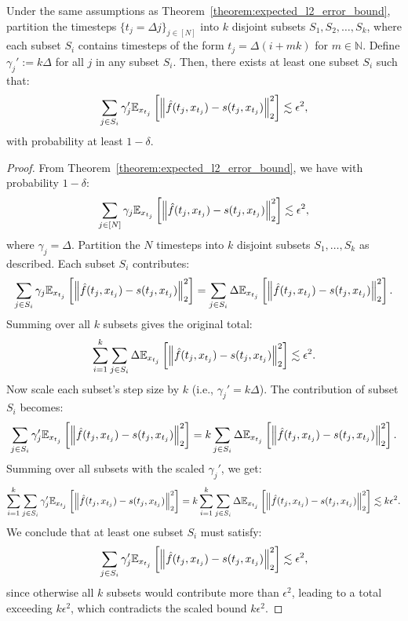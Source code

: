 \begin{theorem}\label{thm:subsampled_error_bound_appendix}
Under the same assumptions as Theorem~\ref{theorem:expected_l2_error_bound}, partition the timesteps $\{t_j = \Delta j\}_{j \in [N]}$ into $k$ disjoint subsets $S_1, S_2, \dots, S_k$, where each subset $S_i$ contains timesteps of the form $t_j = \Delta(i + mk)$ for $m \in \mathbb{N}$. Define $\gamma_j' := k\Delta$ for all $j$ in any subset $S_i$. Then, there exists at least one subset $S_i$ such that:
\[
\sum_{j \in S_i} \gamma_j' \mathbb{E}_{x_{t_j}}\left[\left\lVert\hat{f}(t_j, x_{t_j}) - s(t_j, x_{t_j})\right\rVert_2^2\right] \lesssim \epsilon^2,
\]
with probability at least $1 - \delta$.
\end{theorem}
\begin{proof}
From Theorem~\ref{theorem:expected_l2_error_bound}, we have with probability $1-\delta$:
\[
\sum_{j \in [N]} \gamma_j \mathbb{E}_{x_{t_j}}\left[\left\lVert\hat{f}(t_j, x_{t_j}) - s(t_j, x_{t_j})\right\rVert_2^2\right] \lesssim \epsilon^2,
\]
where $\gamma_j = \Delta$. Partition the $N$ timesteps into $k$ disjoint subsets $S_1, \dots, S_k$ as described. Each subset $S_i$ contributes:
\[
\sum_{j \in S_i} \gamma_j \mathbb{E}_{x_{t_j}}\left[\left\lVert\hat{f}(t_j, x_{t_j}) - s(t_j, x_{t_j})\right\rVert_2^2\right] = \sum_{j \in S_i} \Delta \mathbb{E}_{x_{t_j}}\left[\left\lVert\hat{f}(t_j, x_{t_j}) - s(t_j, x_{t_j})\right\rVert_2^2\right].
\]
Summing over all $k$ subsets gives the original total:
\[
\sum_{i=1}^k \sum_{j \in S_i} \Delta \mathbb{E}_{x_{t_j}}\left[\left\lVert\hat{f}(t_j, x_{t_j}) - s(t_j, x_{t_j})\right\rVert_2^2\right] \lesssim \epsilon^2.
\]
Now scale each subset's step size by $k$ (i.e., $\gamma_j' = k\Delta$). The contribution of subset $S_i$ becomes:
\[
\sum_{j \in S_i} \gamma_j' \mathbb{E}_{x_{t_j}}\left[\left\lVert\hat{f}(t_j, x_{t_j}) - s(t_j, x_{t_j})\right\rVert_2^2\right] = k \sum_{j \in S_i} \Delta \mathbb{E}_{x_{t_j}}\left[\left\lVert\hat{f}(t_j, x_{t_j}) - s(t_j, x_{t_j})\right\rVert_2^2\right].
\]
Summing over all subsets with the scaled $\gamma_j'$, we get:
\[
\sum_{i=1}^k \sum_{j \in S_i} \gamma_j' \mathbb{E}_{x_{t_j}}\left[\left\lVert\hat{f}(t_j, x_{t_j}) - s(t_j, x_{t_j})\right\rVert_2^2\right] = k \sum_{i=1}^k \sum_{j \in S_i} \Delta \mathbb{E}_{x_{t_j}}\left[\left\lVert\hat{f}(t_j, x_{t_j}) - s(t_j, x_{t_j})\right\rVert_2^2\right] \lesssim k \epsilon^2.
\]
We conclude that at least one subset $S_i$ must satisfy:
\[
\sum_{j \in S_i} \gamma_j' \mathbb{E}_{x_{t_j}}\left[\left\lVert\hat{f}(t_j, x_{t_j}) - s(t_j, x_{t_j})\right\rVert_2^2\right] \lesssim \epsilon^2,
\]
since otherwise all $k$ subsets would contribute more than $\epsilon^2$, leading to a total exceeding $k \epsilon^2$, which contradicts the scaled bound $k \epsilon^2$.
\end{proof}

